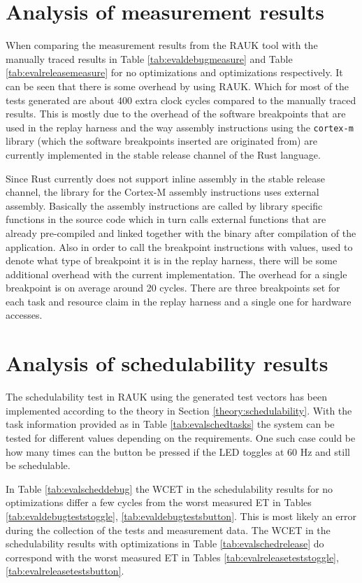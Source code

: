 \section{Analysis of measurement results}
When comparing the measurement results from the RAUK tool with the manually
traced results in Table \ref{tab:evaldebugmeasure} and Table
\ref{tab:evalreleasemeasure} for no optimizations and optimizations
respectively. It can be seen that there is some overhead by using RAUK. Which
for most of the tests generated are about 400 extra clock cycles compared to
the manually traced results. This is mostly due to the overhead of the software
breakpoints that are used in the replay harness and the way assembly
instructions using the \texttt{cortex-m} library (which the software
breakpoints inserted are originated from) are currently implemented in the
stable release channel of the Rust language.

Since Rust currently does not support inline assembly in the stable release
channel, the library for the Cortex-M assembly instructions uses external
assembly. Basically the assembly instructions are called by library specific
functions in the source code which in turn calls external functions that are
already pre-compiled and linked together with the binary after compilation of
the application. Also in order to call the breakpoint instructions with values,
used to denote what type of breakpoint it is in the replay harness, there will
be some additional overhead with the current implementation. The overhead for a
single breakpoint is on average around 20 cycles. There are three breakpoints
set for each task and resource claim in the replay harness and a single one for
hardware accesses.

\section{Analysis of schedulability results}
The schedulability test in RAUK using the generated test vectors has been
implemented according to the theory in Section \ref{theory:schedulability}.
With the task information provided as in Table \ref{tab:evalschedtasks} the
system can be tested for different values depending on the requirements. One
such case could be how many times can the button be pressed if the LED toggles
at 60 Hz and still be schedulable.

In Table \ref{tab:evalscheddebug} the WCET in the schedulability results for no
optimizations differ a few cycles from the worst measured ET in Tables
\ref{tab:evaldebugteststoggle}, \ref{tab:evaldebugtestsbutton}. This is most
likely an error during the collection of the tests and measurement data. The
WCET in the schedulability results with optimizations in Table
\ref{tab:evalschedrelease} do correspond with the worst measured ET in Tables
\ref{tab:evalreleaseteststoggle}, \ref{tab:evalreleasetestsbutton}.

